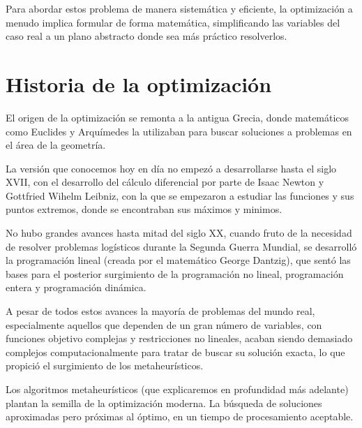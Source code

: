 \documentclass[12pt,a4paper]{book}
\begin{document}
Para abordar estos problema de manera sistemática y eficiente, la optimización a menudo implica formular de forma matemática, simplificando las variables del caso real a un plano abstracto donde sea más práctico resolverlos. 

\section{Historia de la optimización}
El origen de la optimización se remonta a la antigua Grecia, donde matemáticos como Euclides y Arquímedes la utilizaban para buscar soluciones a problemas en el área de la geometría.

La versión que conocemos hoy en día no empezó a desarrollarse hasta el siglo XVII, con el desarrollo del cálculo diferencial por parte de Isaac Newton y Gottfried Wihelm Leibniz, con la que se empezaron a estudiar las funciones y sus puntos extremos,
donde se encontraban sus máximos y minimos.

No hubo grandes avances hasta mitad del siglo XX, cuando fruto de la necesidad de resolver problemas logísticos durante la Segunda Guerra Mundial, se desarrolló la programación lineal (creada por el matemático George Dantzig),
que sentó las bases para el posterior surgimiento de la programación no lineal, programación entera y programación dinámica.

A pesar de todos estos avances la mayoría de problemas del mundo real, especialmente aquellos que dependen de un gran número de variables, con funciones objetivo complejas y restricciones no lineales,
acaban siendo demasiado complejos computacionalmente para tratar de buscar su solución exacta, lo que propició el surgimiento de los metaheurísticos.

Los algoritmos metaheurísticos (que explicaremos en profundidad más adelante) plantan la semilla de la optimización moderna. La búsqueda de soluciones aproximadas pero próximas al óptimo, en un tiempo de procesamiento aceptable.
\end{document}
